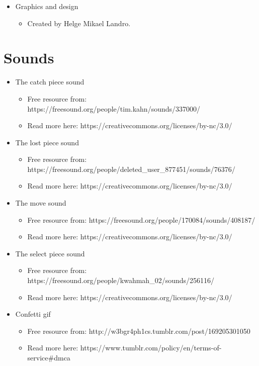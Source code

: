 \documentclass{article}
\begin{document}
\begin{itemize}
\item Graphics and design
    \begin{itemize}
        \item Created by Helge Mikael Landro.
        \end{itemize}
\end{itemize}

\section*{Sounds}
\begin{itemize}
\item The catch piece sound
    \begin{itemize}
        \item Free resource from:  https://freesound.org/people/tim.kahn/sounds/337000/
        \item Read more here: https://creativecommons.org/licenses/by-nc/3.0/
        \end{itemize}
\end{itemize}

\begin{itemize}
\item The lost piece sound
    \begin{itemize}
        \item Free resource from: https://freesound.org/people/deleted\_user\_877451/sounds/76376/
        \item Read more here: https://creativecommons.org/licenses/by-nc/3.0/
        \end{itemize}
\end{itemize}

\begin{itemize}
\item The move sound
    \begin{itemize}
        \item Free resource from:  https://freesound.org/people/170084/sounds/408187/
        \item Read more here: https://creativecommons.org/licenses/by-nc/3.0/
        \end{itemize}
\end{itemize}

\begin{itemize}
\item The select piece sound
    \begin{itemize}
        \item Free resource from: https://freesound.org/people/kwahmah\_02/sounds/256116/
        \item Read more here: https://creativecommons.org/licenses/by-nc/3.0/
        \end{itemize}
\end{itemize}

\begin{itemize}
\item Confetti gif
    \begin{itemize}
        \item Free resource from: http://w3bgr4ph1cs.tumblr.com/post/169205301050
        \item Read more here: https://www.tumblr.com/policy/en/terms-of-service#dmca
        \end{itemize}
\end{itemize}
\end{document}
